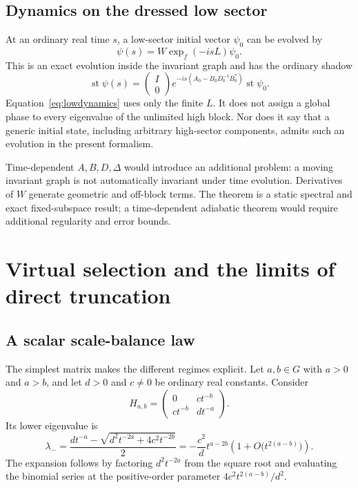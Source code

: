 \documentclass[11pt,oneside]{article}
\numberwithin{equation}{section}
\theoremstyle{plain}
\theoremstyle{definition}
\theoremstyle{remark}
\newcommand{\st}{\operatorname{st}}
\begin{document}
\subsection{Dynamics on the dressed low sector}
At an ordinary real time $s$, a low-sector initial vector $\psi_0$ can be evolved by
\begin{equation}\label{eq:lowdynamics}
 \psi(s)=W\exp_f(-isL)\psi_0.
\end{equation}
This is an exact evolution inside the invariant graph and has the ordinary shadow
\[
 \st\psi(s)=
 \begin{pmatrix}I\\0\end{pmatrix}
 e^{-is(A_0-B_0D_0^{-1}B_0^*)}\st\psi_0.
\]
Equation~\eqref{eq:lowdynamics} uses only the finite $L$. It does not assign a global phase to every eigenvalue of the unlimited high block. Nor does it say that a generic initial state, including arbitrary high-sector components, admits such an evolution in the present formalism.

Time-dependent $A,B,D,\Delta$ would introduce an additional problem: a moving invariant graph is not automatically invariant under time evolution. Derivatives of $W$ generate geometric and off-block terms. The theorem is a static spectral and exact fixed-subspace result; a time-dependent adiabatic theorem would require additional regularity and error bounds.

\section{Virtual selection and the limits of direct truncation}\label{sec:virtual}

\subsection{A scalar scale-balance law}
The simplest matrix makes the different regimes explicit. Let $a,b\in G$ with $a>0$ and $a>b$, and let $d>0$ and $c\ne0$ be ordinary real constants. Consider
\[
 H_{a,b}=\begin{pmatrix}0&c t^{-b}\\c t^{-b}&d t^{-a}\end{pmatrix}.
\]
Its lower eigenvalue is
\begin{equation}\label{eq:scalarlambda}
 \lambda_-=
 \frac{d t^{-a}-\sqrt{d^2t^{-2a}+4c^2t^{-2b}}}{2}
 =-\frac{c^2}{d}t^{a-2b}
 \left(1+O\bigl(t^{2(a-b)}\bigr)\right).
\end{equation}
The expansion follows by factoring $d^2t^{-2a}$ from the square root and evaluating the binomial series at the positive-order parameter $4c^2t^{2(a-b)}/d^2$.
\end{document}
